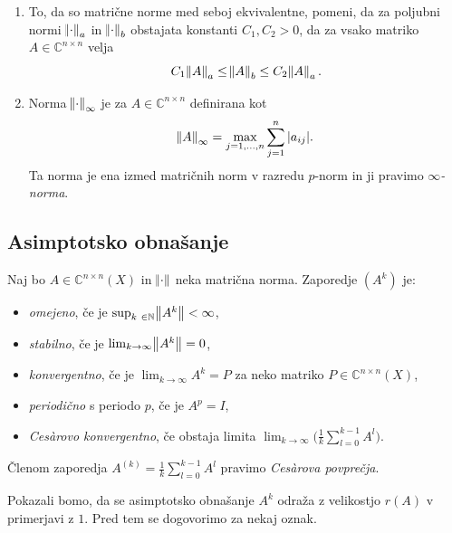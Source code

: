 \documentclass[mat1]{fmfdelo}
\newcommand{\N}{\mathbb N}
\newcommand{\C}{\mathbb C}
\begin{document}
\begin{opomba}
    \leavevmode
    \begin{enumerate}
        \item To, da so matrične norme med seboj ekvivalentne, pomeni, da za poljubni normi $\norm{\cdot}_a$ in $\norm{\cdot}_b$ obstajata konstanti $C_1, C_2 > 0$, da za vsako matriko $A \in \C^{n \times n}$ velja
        \begin{equation}
            C_1 \norm{A}_a \leq \norm{A}_b \leq C_2 \norm{A}_a.
        \end{equation}
        \item Norma $\norm{\cdot}_\infty$ je za $A \in \C^{n \times n}$ definirana kot
        \begin{equation}
            \norm{A}_\infty = \max_{j = 1, \ldots, n} \sum_{j = 1}^n |a_{ij}|.
        \end{equation}
        Ta norma je ena izmed matričnih norm v razredu $p$-norm in ji pravimo \emph{$\infty$-norma}.
    \end{enumerate}
\end{opomba}

\subsection{Asimptotsko obnašanje}
\begin{definicija}
    Naj bo $A \in \C^{n \times n}(X)$ in $\norm{\cdot}$ neka matrična norma. Zaporedje $(A^k)$ je:
    \begin{itemize}
        \item \emph{omejeno}, če je $\sup_{k \in \N} \norm{A^k} < \infty$,
        \item \emph{stabilno}, če je $\lim_{k \rightarrow \infty} \norm{A^k} = 0$,
        \item \emph{konvergentno}, če je $\lim_{k \rightarrow \infty} A^k = P$ za neko matriko $P \in \C^{n \times n}(X)$,
        \item \emph{periodično} s periodo $p$, če je $A^p = I$,
        \item \emph{Ces\`arovo konvergentno}, če obstaja limita $\lim_{k \rightarrow \infty} \Big(\frac{1}{k}\sum_{l=0}^{k-1} A^l\Big)$.
    \end{itemize}
    Členom zaporedja $A^{(k)} = \frac{1}{k}\sum_{l=0}^{k-1} A^l$ pravimo \emph{Ces\`arova povprečja}.
\end{definicija}
Pokazali bomo, da se asimptotsko obnašanje $A^k$ odraža z velikostjo $r(A)$ v primerjavi z $1$. Pred tem se dogovorimo za nekaj oznak.
\end{document}
